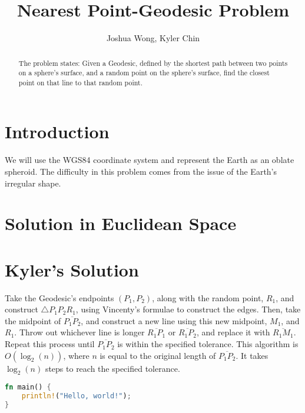 \documentclass[a4paper,10pt]{article}
\title{Nearest Point-Geodesic Problem}
\author{Joshua Wong, Kyler Chin}
\begin{document}
\maketitle

\begin{abstract}
The problem states: Given a Geodesic, defined by the shortest path between two points on a sphere's surface, and a random point on the sphere's surface, find the closest point on that line to that random point.
\end{abstract}

\section{Introduction}
We will use the WGS84 coordinate system and represent the Earth as an oblate spheroid. The difficulty in this problem comes from the issue of the Earth's irregular shape.

\section{Solution in Euclidean Space}
\section{Kyler's Solution}
Take the Geodesic's endpoints $(P_1, P_2)$, along with the random point, $R_1$, and construct $\triangle{P_1P_2R_1}$, using Vincenty's formulae to construct the edges. Then, take the midpoint of $\overline{P_1P_2}$, and construct a new line using this new midpoint, $M_1$, and $R_1$. Throw out whichever line is longer $\overline{R_1P_1}$ or $\overline{R_1P_2}$, and replace it with $\overline{R_1M_1}$. Repeat this process until $\overline{P_1P_2}$ is within the specified tolerance. This algorithm is $O(\log_2(n))$, where $n$ is equal to the original length of $\overline{P_1P_2}$. It takes $\log_2(n)$ steps to reach the specified tolerance.

\begin{lstlisting}[language=rust]
fn main() {
    println!("Hello, world!");
}
\end{lstlisting}
\end{document}
